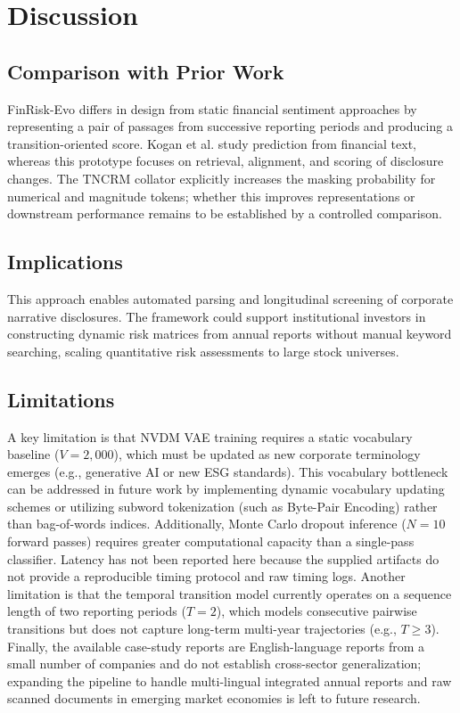 \documentclass[pdflatex,sn-basic,Numbered]{sn-jnl}
\begin{document}
\section{Discussion}

\subsection{Comparison with Prior Work}
FinRisk-Evo differs in design from static financial sentiment approaches \cite{araci2019, loughran2011} by representing a pair of passages from successive reporting periods and producing a transition-oriented score. Kogan et al. \cite{kogan2009} study prediction from financial text, whereas this prototype focuses on retrieval, alignment, and scoring of disclosure changes. The TNCRM collator explicitly increases the masking probability for numerical and magnitude tokens; whether this improves representations or downstream performance remains to be established by a controlled comparison.

\subsection{Implications}
This approach enables automated parsing and longitudinal screening of corporate narrative disclosures. The framework could support institutional investors in constructing dynamic risk matrices from annual reports without manual keyword searching, scaling quantitative risk assessments to large stock universes.

\subsection{Limitations}
A key limitation is that NVDM VAE training requires a static vocabulary baseline ($V=2,000$), which must be updated as new corporate terminology emerges (e.g., generative AI or new ESG standards). This vocabulary bottleneck can be addressed in future work by implementing dynamic vocabulary updating schemes or utilizing subword tokenization (such as Byte-Pair Encoding) rather than bag-of-words indices. Additionally, Monte Carlo dropout inference ($N=10$ forward passes) requires greater computational capacity than a single-pass classifier. Latency has not been reported here because the supplied artifacts do not provide a reproducible timing protocol and raw timing logs. Another limitation is that the temporal transition model currently operates on a sequence length of two reporting periods ($T=2$), which models consecutive pairwise transitions but does not capture long-term multi-year trajectories (e.g., $T \ge 3$). Finally, the available case-study reports are English-language reports from a small number of companies and do not establish cross-sector generalization; expanding the pipeline to handle multi-lingual integrated annual reports and raw scanned documents in emerging market economies is left to future research.
\end{document}
